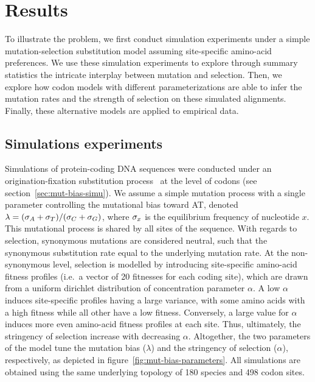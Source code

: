\section{Results}
\label{sec:results}

To illustrate the problem, we first conduct simulation experiments under a simple mutation-selection \gls{substitution} model assuming site-specific amino-acid preferences.
We use these simulation experiments to explore through summary statistics the intricate interplay between mutation and selection.
Then, we explore how \gls{codon} models with different parameterizations are able to infer the mutation rates and the strength of selection on these simulated alignments.
Finally, these alternative models are applied to empirical data.

\subsection{Simulations experiments}
\label{subsec:simulations-experiments}

Simulations of protein-coding \acrshort{DNA} sequences were conducted under an origination-fixation \gls{substitution} process~\citep{McCandlish2014} at the level of \glspl{codon} (see section~\ref{sec:mut-bias-simu}).
We assume a simple mutation process with a single parameter controlling the mutational bias toward AT, denoted $\lambda = (\sigma_A+\sigma_T)/(\sigma_C+\sigma_G)$, where $\sigma_x$ is the equilibrium frequency of nucleotide $x$.
This mutational process is shared by all sites of the sequence.
With regards to selection, \gls{synonymous} mutations are considered \gls{neutral}, such that the \gls{synonymous} \gls{substitution} rate equal to the underlying mutation rate.
At the \gls{non-synonymous} level, selection is modelled by introducing site-specific amino-acid fitness profiles (i.e.~a vector of 20 fitnesses for each coding site), which are drawn from a uniform dirichlet distribution of concentration parameter $\alpha$.
A low $\alpha$ induces site-specific profiles having a large variance, with some amino acids with a high fitness while all other have a low fitness.
Conversely, a large value for $\alpha$ induces more even amino-acid fitness profiles at each site.
Thus, ultimately, the stringency of selection increase with decreasing $\alpha$.
Altogether, the two parameters of the model tune the mutation bias ($\lambda$) and the stringency of selection ($\alpha$), respectively, as depicted in figure~\ref{fig:mut-bias-parameters}.
All simulations are obtained using the same underlying topology of 180 species and 498 \gls{codon} sites.

